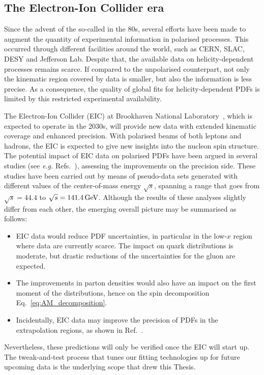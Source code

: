 \subsection*{The Electron-Ion Collider era}

Since the advent of the so-called  in the 80s, several efforts have been made to augment the quantity of experimental information in polarised processes. This occurred through different facilities around the world, such as CERN, SLAC, DESY and Jefferson Lab. Despite that, the available data on helicity-dependent processes remains scarce. If compared to the unpolarised counterpart, not only the kinematic region covered by data is smaller, but also the information is less precise. As a consequence, the quality of global fits for helicity-dependent PDFs is limited by this restricted experimental availability. 

The Electron-Ion Collider (EIC) at Brookhaven National Laboratory~\cite{AbdulKhalek:2021gbh}, which is expected to operate in the 2030s, will provide new data with extended kinematic coverage and enhanced precision. With polarised beams of both leptons and hadrons, the EIC is expected to give new insights into the nucleon spin structure. The potential impact of EIC data on polarised PDFs have been argued in several studies (see \textit{e.g.} Refs.~\cite{Borsa:2020lsz, Aschenauer:2012ve, Ball:2013tyh, Aschenauer:2015ata}), assessing the improvements on the precision side. These studies have been carried out by means of pseudo-data sets generated with different values of the center-of-mass energy $\sqrt{s}$, spanning a range that goes from $\sqrt{s} = 44.4$ to $\sqrt{s} = 141.4 \,\textrm{GeV}$. Although the results of these analyses slightly differ from each other, the emerging overall picture may be summarised as follows:
%
\begin{itemize}
  \item EIC data would reduce PDF uncertainties, in particular in the low-$x$ region where data are currently scarce. The impact on quark distributions is moderate, but drastic reductions of the uncertainties for the gluon are expected.
  \item The improvements in parton densities would also have an impact on the first moment of the distributions, hence on the spin decomposition Eq.~\eqref{eq:AM_decomposition}.
  \item Incidentally, EIC data may improve the precision of PDFs in the extrapolation regions, as shown in Ref.~\cite{Ball:2013tyh}.
\end{itemize}
%
Nevertheless, these predictions will only be verified once the EIC will start up. The tweak-and-test process that tunes our fitting technologies up for future upcoming data is the underlying scope that drew this Thesis.


